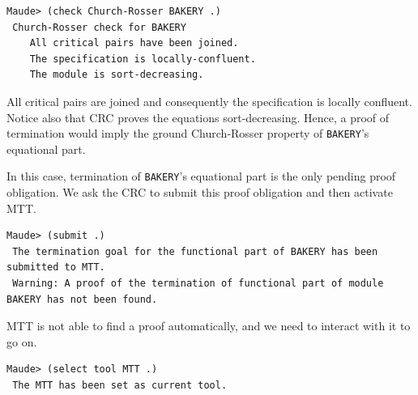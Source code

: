 \documentclass{llncs}
\begin{document}
\begin{lstlisting}[style=AMMA, language=MaudeCommand, numbers=none]
 Maude> (check Church-Rosser BAKERY .)
 Church-Rosser check for BAKERY
    All critical pairs have been joined.
    The specification is locally-confluent.
    The module is sort-decreasing.
\end{lstlisting}
All critical pairs are joined and consequently  the specification is locally confluent.
Notice also that CRC proves the equations sort-decreasing. Hence, a proof of termination would 
imply the ground Church-Rosser property of \verb"BAKERY"'s equational part.

In this case, termination of  \verb"BAKERY"'s equational part is the only
pending proof obligation. We ask the CRC to submit this proof obligation
and then activate MTT.

\begin{lstlisting}[style=AMMA, language=MaudeCommand, numbers=none]
 Maude> (submit .)
 The termination goal for the functional part of BAKERY has been submitted to MTT.
 Warning: A proof of the termination of functional part of module BAKERY has not been found.
\end{lstlisting}

\noindent MTT is not able to find a proof automatically, and we need to interact with it to go on. 

\begin{lstlisting}[style=AMMA, language=MaudeCommand, numbers=none]
 Maude> (select tool MTT .)
 The MTT has been set as current tool.
\end{lstlisting}



\end{document}
